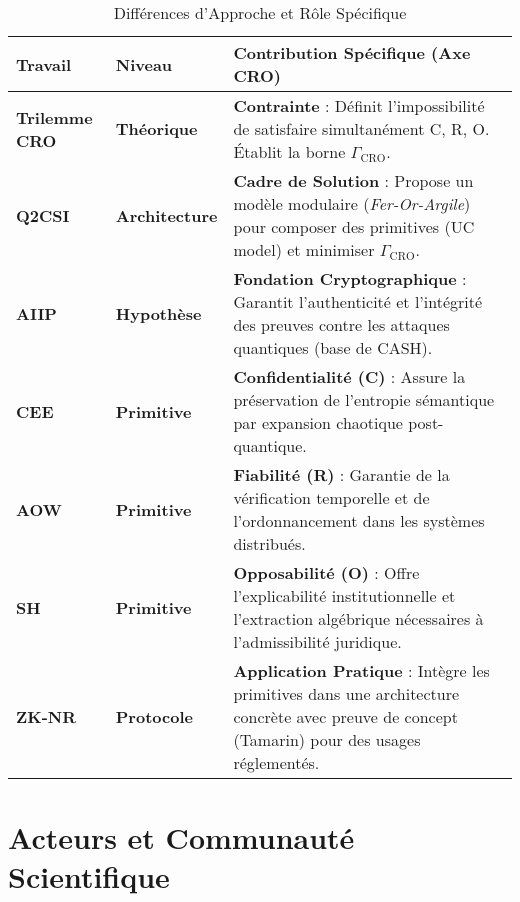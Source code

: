 \documentclass[11pt]{article}
\begin{document}

\begin{table}[H]
\centering
\caption{Différences d'Approche et Rôle Spécifique}
\label{tab:differences}
\begin{tabular}{>{\centering\arraybackslash}m{2.5cm} | >{\centering\arraybackslash}m{2.5cm} | >{\raggedright\arraybackslash}m{10cm}}
\toprule
\textbf{Travail} & \textbf{Niveau} & \textbf{Contribution Spécifique (Axe CRO)} \\
\midrule
\textbf{Trilemme CRO} & \textbf{Théorique} & \textbf{Contrainte} : Définit l'impossibilité de satisfaire simultanément C, R, O. Établit la borne $\Gamma_{\text{CRO}}$. \\
\midrule
\textbf{Q2CSI} & \textbf{Architecture} & \textbf{Cadre de Solution} : Propose un modèle modulaire (\textit{Fer-Or-Argile}) pour composer des primitives (UC model) et minimiser $\Gamma_{\text{CRO}}$. \\
\midrule
\textbf{AIIP} & \textbf{Hypothèse} & \textbf{Fondation Cryptographique} : Garantit l'authenticité et l'intégrité des preuves contre les attaques quantiques (base de CASH). \\
\midrule
\textbf{CEE} & \textbf{Primitive} & \textbf{Confidentialité (C)} : Assure la préservation de l'entropie sémantique par expansion chaotique post-quantique. \\
\midrule
\textbf{AOW} & \textbf{Primitive} & \textbf{Fiabilité (R)} : Garantie de la vérification temporelle et de l'ordonnancement dans les systèmes distribués. \\
\midrule
\textbf{SH} & \textbf{Primitive} & \textbf{Opposabilité (O)} : Offre l'explicabilité institutionnelle et l'extraction algébrique nécessaires à l'admissibilité juridique. \\
\midrule
\textbf{ZK-NR} & \textbf{Protocole} & \textbf{Application Pratique} : Intègre les primitives dans une architecture concrète avec preuve de concept (Tamarin) pour des usages réglementés. \\
\bottomrule
\end{tabular}
\end{table}


\newpage

\section{Acteurs et Communauté Scientifique}
\end{document}
